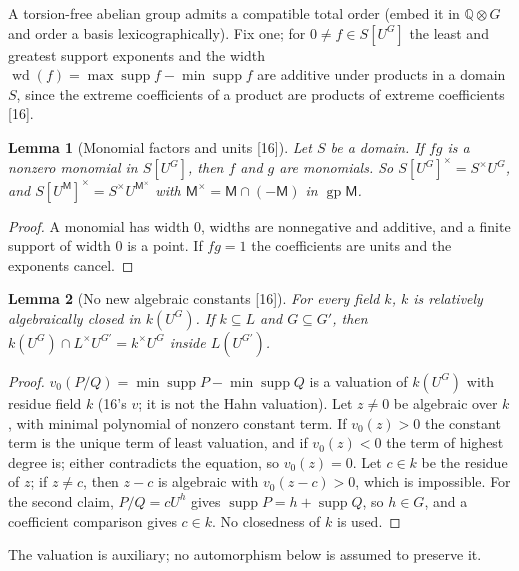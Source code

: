 \documentclass[11pt,oneside]{article}
\numberwithin{equation}{section}
\newtheorem{lemma}[lemma]{Lemma}
\theoremstyle{definition}
\theoremstyle{remark}
\newcommand{\Q}{\mathbb Q}
\newcommand{\supp}{\operatorname{supp}}
\newcommand{\src}[1]{\textup{\textsf{\small[#1]}}}
\begin{document}
A torsion-free abelian group admits a compatible total order (embed it in $\Q\otimes G$ and order a basis
lexicographically). Fix one; for $0\ne f\in S[U^G]$ the least and greatest support exponents and the width
$\operatorname{wd}(f)=\max\supp f-\min\supp f$ are additive under products in a domain $S$, since the extreme
coefficients of a product are products of extreme coefficients \src{16}.

\begin{lemma}[Monomial factors and units \src{16}]\label{opa:cr:lem:units}
Let $S$ be a domain. If $fg$ is a nonzero monomial in $S[U^G]$, then $f$ and $g$ are monomials. So
$S[U^G]^\times=S^\times U^G$, and $S[U^{\mathsf M}]^\times=S^\times U^{\mathsf M^\times}$ with
$\mathsf M^\times=\mathsf M\cap(-\mathsf M)$ in $\operatorname{gp}\mathsf M$.
\end{lemma}
\begin{proof}
A monomial has width $0$, widths are nonnegative and additive, and a finite support of width $0$ is a
point. If $fg=1$ the coefficients are units and the exponents cancel.
\end{proof}

\begin{lemma}[No new algebraic constants \src{16}]\label{opa:cr:lem:constants}
For every field $k$, $k$ is relatively algebraically closed in $k(U^G)$. If $k\subseteq L$ and $G\subseteq G'$,
then $k(U^G)\cap L^\times U^{G'}=k^\times U^G$ inside $L(U^{G'})$.
\end{lemma}
\begin{proof}
$v_0(P/Q)=\min\supp P-\min\supp Q$ is a valuation of $k(U^G)$ with residue field $k$ (16's $v$; it is not the
Hahn valuation). Let $z\ne0$ be algebraic over $k$, with minimal polynomial of nonzero constant term. If
$v_0(z)>0$ the constant term is the unique term of least valuation, and if $v_0(z)<0$ the term of highest
degree is; either contradicts the equation, so $v_0(z)=0$. Let $c\in k$ be the residue of $z$; if $z\ne c$,
then $z-c$ is algebraic with $v_0(z-c)>0$, which is impossible. For the second claim, $P/Q=cU^h$ gives $\supp P=h+\supp Q$, so $h\in G$, and a coefficient
comparison gives $c\in k$. No closedness of $k$ is used.
\end{proof}

The valuation is auxiliary; no automorphism below is assumed to preserve it.
\end{document}
